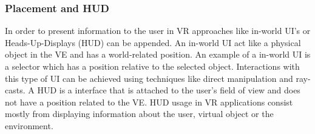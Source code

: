 \subsubsection{Placement and HUD}
In order to present information to the user in VR approaches like in-world UI's or Heads-Up-Displays (HUD) can be appended. An in-world UI act like a physical object in the VE and has a world-related position. An example of a in-world UI is a selector\label{theory:toolsandtech:selector} which has a position relative to the selected object. Interactions with this type of UI can be achieved using techniques like direct manipulation\label{theory:toolsandtech:direct} and ray-casts\label{theory:toolsandtech:raycast}. A HUD is a interface that is attached to the user's field of view and does not have a position related to the VE. HUD usage in VR applications consist mostly from displaying information about the user, virtual object or the environment\cite{interface:sherman2002understanding}.

